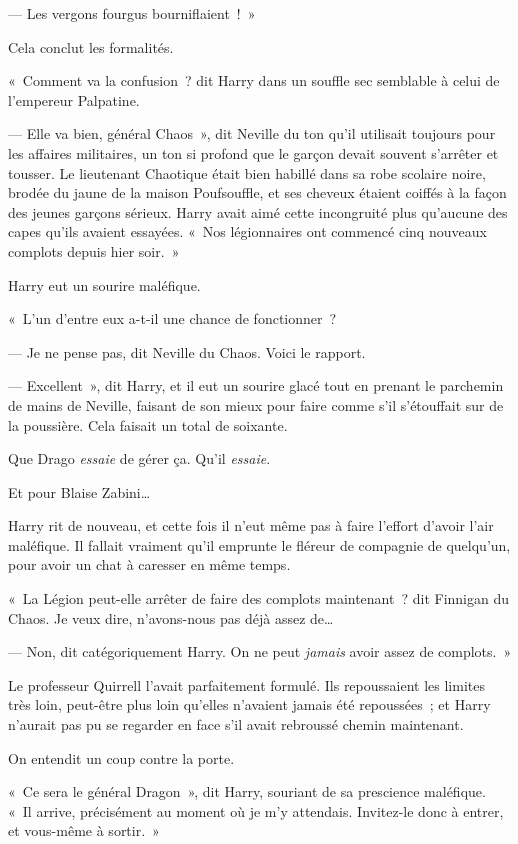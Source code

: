 --- Les vergons fourgus bourniflaient~!~»

Cela conclut les formalités.

«~Comment va la confusion~? dit Harry dans un souffle sec semblable à celui de l'empereur Palpatine.

--- Elle va bien, général Chaos~», dit Neville du ton qu'il utilisait toujours pour les affaires militaires, un ton si profond que le garçon devait souvent s'arrêter et tousser.
Le lieutenant Chaotique était bien habillé dans sa robe scolaire noire, brodée du jaune de la maison Poufsouffle, et ses cheveux étaient coiffés à la façon des jeunes garçons sérieux.
Harry avait aimé cette incongruité plus qu'aucune des capes qu'ils avaient essayées.
«~Nos légionnaires ont commencé cinq nouveaux complots depuis hier soir.~»

Harry eut un sourire maléfique.

«~L'un d'entre eux a-t-il une chance de fonctionner~?

--- Je ne pense pas, dit Neville du Chaos.
Voici le rapport.

--- Excellent~», dit Harry, et il eut un sourire glacé tout en prenant le parchemin de mains de Neville, faisant de son mieux pour faire comme s'il s'étouffait sur de la poussière.
Cela faisait un total de soixante.

Que Drago \emph{essaie} de gérer ça.
Qu'il \emph{essaie}.

Et pour Blaise Zabini…

Harry rit de nouveau, et cette fois il n'eut même pas à faire l'effort d'avoir l'air maléfique.
Il fallait vraiment qu'il emprunte le fléreur de compagnie de quelqu'un, pour avoir un chat à caresser en même temps.

«~La Légion peut-elle arrêter de faire des complots maintenant~? dit Finnigan du Chaos.
Je veux dire, n'avons-nous pas déjà assez de…

--- Non, dit catégoriquement Harry.
On ne peut \emph{jamais} avoir assez de complots.~»

Le professeur Quirrell l'avait parfaitement formulé.
Ils repoussaient les limites très loin, peut-être plus loin qu'elles n'avaient jamais été repoussées~; et Harry n'aurait pas pu se regarder en face s'il avait rebroussé chemin maintenant.

On entendit un coup contre la porte.

«~Ce sera le général Dragon~», dit Harry, souriant de sa prescience maléfique.
«~Il arrive, précisément au moment où je m'y attendais.
Invitez-le donc à entrer, et vous-même à sortir.~»

